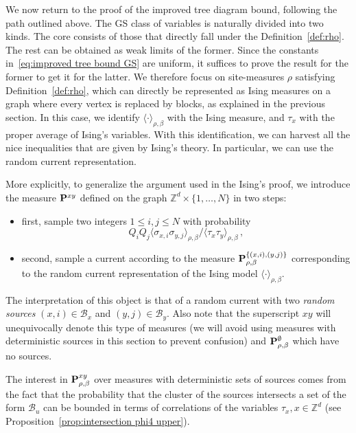 \documentclass[a4paper,oneside,11pt]{article}
\def\Z{\mathbb{Z}}                          %
\numberwithin{equation}{section}
\numberwithin{equation}{section}
\numberwithin{equation}{section}
\newcommand{\calB}{\mathcal{B}}
\def\Z{\mathbb{Z}}                          %
\begin{document}
We now return to the proof of the improved tree diagram bound, following the path outlined above.  
 The GS class of variables is naturally divided into two kinds. The core consists of those that directly fall under the Definition~\ref{def:rho}.  The rest can be obtained as weak limits of the former. Since the constants in~\eqref{eq:improved tree bound GS} are uniform, it suffices to prove the result for the former to get it for the latter. We therefore focus on site-measures $\rho$ satisfying Definition~\ref{def:rho}, which can directly be represented as Ising measures on a graph where every vertex is replaced by blocks, as explained in the previous section. In this case, we identify $\langle\cdot\rangle_{\rho,\beta}$ with the Ising measure, and $\tau_x$ with the proper average of  Ising's variables. With this identification, we can harvest all the nice inequalities that are given by Ising's theory. In particular, we can use the random current representation.

More explicitly,  to generalize the argument used in the Ising's proof, we introduce the measure ${\bf P}^{xy}$ defined on  the graph   $\Z^d\times \{1,\dots,N\}$  in two steps: 
\begin{itemize}
\item first, sample two integers $1\le i,j\le N$ with probability 
$$Q_{i}Q_{j}\langle\sigma_{x,i}\sigma_{y,j}\rangle_{\rho,\beta}/\langle\tau_x\tau_y\rangle_{\rho,\beta}\,, $$ 
\item second, sample a current according to the measure ${\bf P}^{\{(x,i),(y,j)\}}_{\rho,\beta}$ corresponding to the random current representation of the Ising model $\langle\cdot\rangle_{\rho,\beta}$. 
\end{itemize}
The interpretation of this object is that of a random current with two {\em random sources} $(x,i)\in \calB_x$ and $(y,j)\in \calB_y$. Also note that the superscript $xy$ will unequivocally denote this type of measures (we will avoid using measures with deterministic sources in this section to prevent confusion)  and ${\bf P}^\emptyset_{\rho,\beta}$ which have no sources. 

The interest in ${\bf P}^{xy}_{\rho,\beta}$ over measures with deterministic sets of sources comes from the fact that the probability that the cluster of the sources intersects a set of the form $\calB_u$ can be bounded in terms of correlations of the variables $\tau_x, x\in\Z^d$ (see Proposition~\ref{prop:intersection phi4 upper}). 
\end{document}
